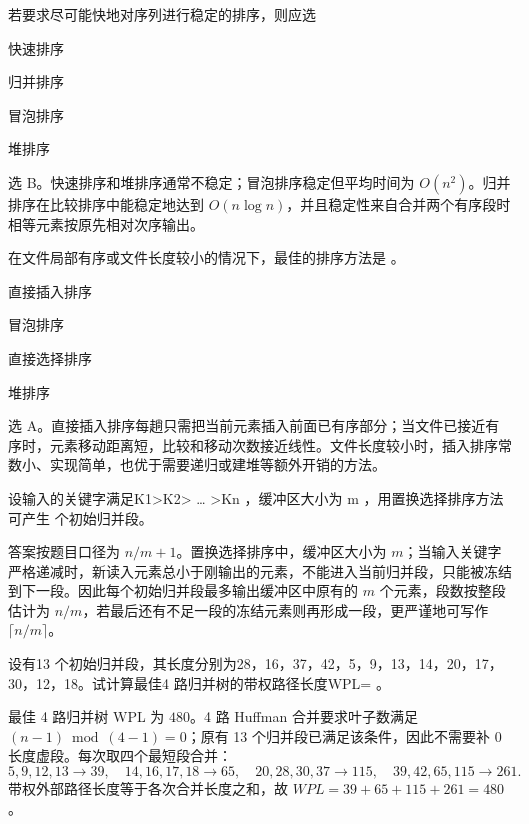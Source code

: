 \begin{question}
若要求尽可能快地对序列进行稳定的排序，则应选 \blank
\begin{choiceoptions}[2]
  \item 快速排序
  \item 归并排序
  \item 冒泡排序
  \item 堆排序
\end{choiceoptions}
\begin{solution}
选 B。快速排序和堆排序通常不稳定；冒泡排序稳定但平均时间为 $O(n^2)$。归并排序在比较排序中能稳定地达到 $O(n\log n)$，并且稳定性来自合并两个有序段时相等元素按原先相对次序输出。
\end{solution}
\end{question}

\begin{question}
在文件局部有序或文件长度较小的情况下，最佳的排序方法是 \blank。
\begin{choiceoptions}[2]
  \item 直接插入排序
  \item 冒泡排序
  \item 直接选择排序
  \item 堆排序
\end{choiceoptions}
\begin{solution}
选 A。直接插入排序每趟只需把当前元素插入前面已有序部分；当文件已接近有序时，元素移动距离短，比较和移动次数接近线性。文件长度较小时，插入排序常数小、实现简单，也优于需要递归或建堆等额外开销的方法。
\end{solution}
\end{question}

\begin{question}
设输入的关键字满足K1>K2> … >Kn ，缓冲区大小为 m ，用置换选择排序方法可产生 \blank 个初始归并段。
\begin{solution}
答案按题目口径为 $n/m+1$。置换选择排序中，缓冲区大小为 $m$；当输入关键字严格递减时，新读入元素总小于刚输出的元素，不能进入当前归并段，只能被冻结到下一段。因此每个初始归并段最多输出缓冲区中原有的 $m$ 个元素，段数按整段估计为 $n/m$，若最后还有不足一段的冻结元素则再形成一段，更严谨地可写作 $\lceil n/m\rceil$。
\end{solution}
\end{question}

\begin{question}
设有13 个初始归并段，其长度分别为28，16，37，42，5，9，13，14，20，17，30，12，18。试计算最佳4 路归并树的带权路径长度WPL= \blank。
\begin{solution}
最佳 4 路归并树 WPL 为 $480$。4 路 Huffman 合并要求叶子数满足 $(n-1)\bmod(4-1)=0$；原有 13 个归并段已满足该条件，因此不需要补 0 长度虚段。每次取四个最短段合并：
\[
5,9,12,13\to39,\quad
14,16,17,18\to65,\quad
20,28,30,37\to115,\quad
39,42,65,115\to261.
\]
带权外部路径长度等于各次合并长度之和，故 $WPL=39+65+115+261=480$。
\end{solution}
\end{question}

